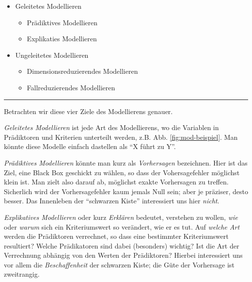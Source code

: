\documentclass[12pt,ngerman,]{book}
\providecommand{\tightlist}{%
  \setlength{\itemsep}{0pt}\setlength{\parskip}{0pt}}
\begin{document}
\begin{itemize}
\tightlist
\item
  Geleitetes Modellieren

  \begin{itemize}
  \tightlist
  \item
    Prädiktives Modellieren
  \item
    Explikaties Modellieren
  \end{itemize}
\item
  Ungeleitetes Modellieren

  \begin{itemize}
  \tightlist
  \item
    Dimensionsreduzierendes Modellieren
  \item
    Fallreduzierendes Modellieren
  \end{itemize}
\end{itemize}

\begin{center}\rule{0.5\linewidth}{\linethickness}\end{center}

Betrachten wir diese vier Ziele des Modellierens genauer.

\emph{Geleitetes Modellieren} ist jede Art
des Modellierens, wo die Variablen in Prädiktoren und Kriterien
unterteilt werden, z.B. Abb. \ref{fig:mod-beispiel}. Man könnte diese
Modelle einfach dastellen als ``X führt zu Y''.

\emph{Prädiktives Modellieren} könnte man
kurz als \emph{Vorhersagen} bezeichnen. Hier ist das
Ziel, eine Black Box geschickt zu wählen, so dass der Vohersagefehler
möglichst klein ist. Man zielt also darauf ab, möglichst exakte
Vorhersagen zu treffen. Sicherlich wird der Vorhersagefehler kaum jemals
Null sein; aber je präziser, desto besser. Das Innenleben der
``schwarzen Kiste'' interessiert uns hier \emph{nicht}.

\emph{Explikatives Modellieren} oder
kurz \emph{Erklären} bedeutet, verstehen zu wollen,
\emph{wie} oder \emph{warum} sich ein Kriteriumswert so verändert, wie
er es tut. Auf \emph{welche Art} werden die Prädiktoren verrechnet, so
dass eine bestimmter Kriteriumswert resultiert? Welche Prädikatoren sind
dabei (besonders) wichtig? Ist die Art der Verrechnung abhängig von den
Werten der Prädiktoren? Hierbei interessiert uns vor allem die
\emph{Beschaffenheit} der schwarzen Kiste; die Güte der Vorhersage ist
zweitrangig.
\end{document}
